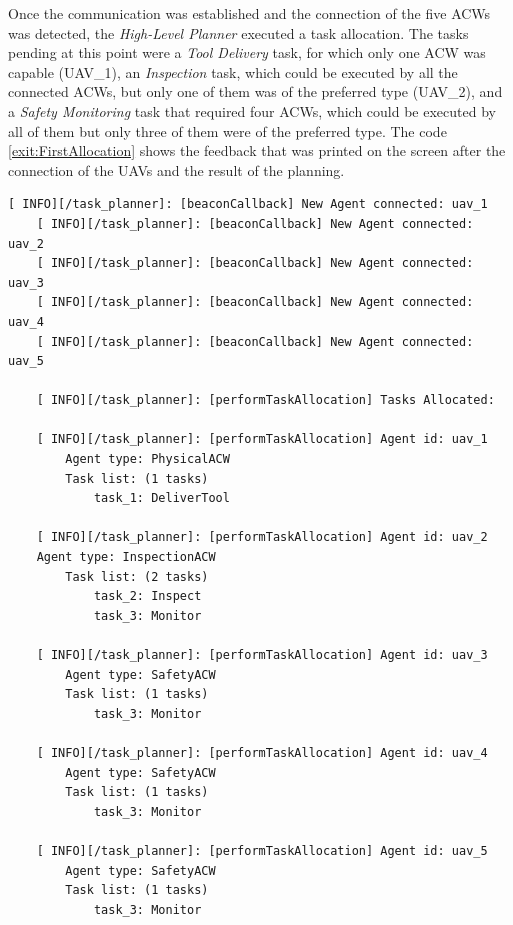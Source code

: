 Once the communication was established and the connection of the five \glspl{ACW} was detected, the \emph{High-Level Planner} executed a task allocation. The tasks pending at this point were a \emph{Tool Delivery} task, for which only one \gls{ACW} was capable (UAV\_1), an \emph{Inspection} task, which could be executed by all the connected \glspl{ACW}, but only one of them was of the preferred type (UAV\_2), and a \emph{Safety Monitoring} task that required four \glspl{ACW}, which could be executed by all of them but only three of them were of the preferred type. The code \ref{exit:FirstAllocation} shows the feedback that was printed on the screen after the connection of the \glspl{UAV} and the result of the planning.

\begin{lstlisting}[caption={Feedback messages printed after the connection of the \glspl{UAV} and the planning}, breaklines=true, label=exit:FirstAllocation]
    [ INFO][/task_planner]: [beaconCallback] New Agent connected: uav_1
    [ INFO][/task_planner]: [beaconCallback] New Agent connected: uav_2
    [ INFO][/task_planner]: [beaconCallback] New Agent connected: uav_3
    [ INFO][/task_planner]: [beaconCallback] New Agent connected: uav_4
    [ INFO][/task_planner]: [beaconCallback] New Agent connected: uav_5
    
    [ INFO][/task_planner]: [performTaskAllocation] Tasks Allocated:
    
    [ INFO][/task_planner]: [performTaskAllocation] Agent id: uav_1
        Agent type: PhysicalACW
        Task list: (1 tasks)
            task_1: DeliverTool
    
    [ INFO][/task_planner]: [performTaskAllocation] Agent id: uav_2
    Agent type: InspectionACW
        Task list: (2 tasks)
            task_2: Inspect
            task_3: Monitor
    
    [ INFO][/task_planner]: [performTaskAllocation] Agent id: uav_3
        Agent type: SafetyACW
        Task list: (1 tasks)
            task_3: Monitor
    
    [ INFO][/task_planner]: [performTaskAllocation] Agent id: uav_4
        Agent type: SafetyACW
        Task list: (1 tasks)
            task_3: Monitor
    
    [ INFO][/task_planner]: [performTaskAllocation] Agent id: uav_5
        Agent type: SafetyACW
        Task list: (1 tasks)
            task_3: Monitor
\end{lstlisting}

